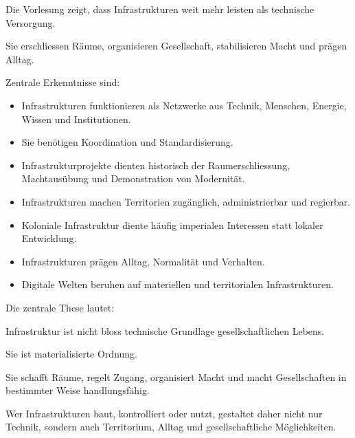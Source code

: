 Die Vorlesung zeigt,
dass Infrastrukturen weit mehr leisten
als technische Versorgung.

Sie erschliessen Räume,
organisieren Gesellschaft,
stabilisieren Macht
und prägen Alltag.

Zentrale Erkenntnisse sind:

\begin{itemize}
\item Infrastrukturen funktionieren als Netzwerke aus Technik, Menschen, Energie, Wissen und Institutionen.
\item Sie benötigen Koordination und Standardisierung.
\item Infrastrukturprojekte dienten historisch der Raumerschliessung, Machtausübung und Demonstration von Modernität.
\item Infrastrukturen machen Territorien zugänglich, administrierbar und regierbar.
\item Koloniale Infrastruktur diente häufig imperialen Interessen statt lokaler Entwicklung.
\item Infrastrukturen prägen Alltag, Normalität und Verhalten.
\item Digitale Welten beruhen auf materiellen und territorialen Infrastrukturen.
\end{itemize}

Die zentrale These lautet:

Infrastruktur ist nicht bloss technische Grundlage
gesellschaftlichen Lebens.

Sie ist materialisierte Ordnung.

Sie schafft Räume,
regelt Zugang,
organisiert Macht
und macht Gesellschaften
in bestimmter Weise handlungsfähig.

Wer Infrastrukturen baut,
kontrolliert oder nutzt,
gestaltet daher nicht nur Technik,
sondern auch Territorium,
Alltag
und gesellschaftliche Möglichkeiten.
